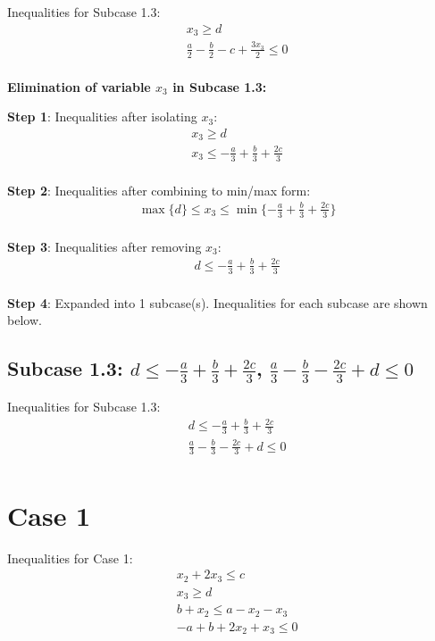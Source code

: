 \documentclass{article}
\begin{document}
Inequalities for Subcase 1.3:
\begin{align}
& x_{3} \geq d \\
& \frac{a}{2} - \frac{b}{2} - c + \frac{3 x_{3}}{2} \leq 0 \\
\end{align}

\textbf{Elimination of variable $x_{3}$ in Subcase 1.3:}

\textbf{Step 1}: Inequalities after isolating $x_{3}$:
\begin{align}
& x_{3} \geq d \\
& x_{3} \leq - \frac{a}{3} + \frac{b}{3} + \frac{2 c}{3} \\
\end{align}

\textbf{Step 2}: Inequalities after combining to min/max form:
\begin{align}
& \max\{d\} \leq x_{3} \leq \min\{- \frac{a}{3} + \frac{b}{3} + \frac{2 c}{3}\} \\
\end{align}

\textbf{Step 3}: Inequalities after removing $x_{3}$:
\begin{align}
& d \leq - \frac{a}{3} + \frac{b}{3} + \frac{2 c}{3} \\
\end{align}

\textbf{Step 4}: Expanded into 1 subcase(s). Inequalities for each subcase are shown below.

\subsection{Subcase 1.3: $d \leq - \frac{a}{3} + \frac{b}{3} + \frac{2 c}{3}$, $\frac{a}{3} - \frac{b}{3} - \frac{2 c}{3} + d \leq 0$}

Inequalities for Subcase 1.3:
\begin{align}
& d \leq - \frac{a}{3} + \frac{b}{3} + \frac{2 c}{3} \\
& \frac{a}{3} - \frac{b}{3} - \frac{2 c}{3} + d \leq 0 \\
\end{align}

\section{Case 1}

Inequalities for Case 1:
\begin{align}
& x_{2} + 2 x_{3} \leq c \\
& x_{3} \geq d \\
& b + x_{2} \leq a - x_{2} - x_{3} \\
& - a + b + 2 x_{2} + x_{3} \leq 0 \\
\end{align}
\end{document}
